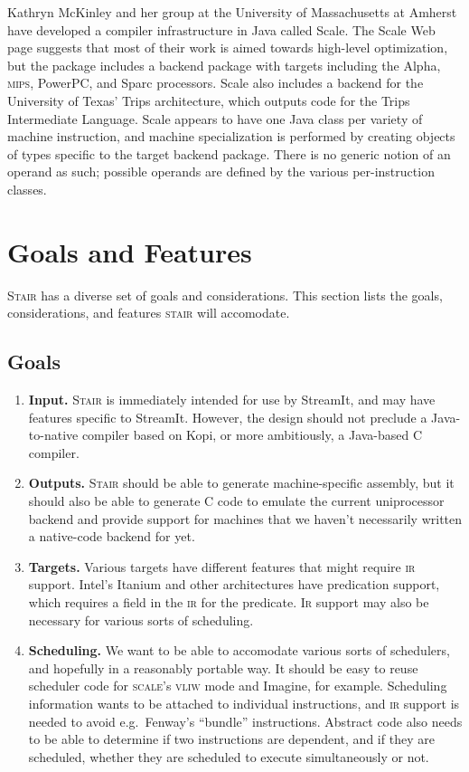 \documentclass[11pt]{article}
\def\ir{\textsc{ir}}
\def\Ir{\textsc{Ir}}
\def\mips{\textsc{mips}}
\def\scale{\textsc{scale}}
\def\stair{\textsc{stair}}
\def\Stair{\textsc{Stair}}
\def\vliw{\textsc{vliw}}
\begin{document}
Kathryn McKinley and her group at the University of Massachusetts at
Amherst have developed a compiler infrastructure in Java called
Scale\cite{scale-umass}.  The Scale Web page suggests that most of
their work is aimed towards high-level optimization, but the package
includes a backend package with targets including the Alpha, \mips,
PowerPC, and Sparc processors.  Scale also includes a backend for the
University of Texas' Trips architecture, which outputs code for the
Trips Intermediate Language.  Scale appears to have one Java class per
variety of machine instruction, and machine specialization is
performed by creating objects of types specific to the target backend
package.  There is no generic notion of an operand as such; possible
operands are defined by the various per-instruction classes.

\section{Goals and Features}

\Stair{} has a diverse set of goals and considerations.  This section
lists the goals, considerations, and features \stair{} will
accomodate.

\subsection{Goals}

\begin{enumerate}
\item \textbf{Input.}  \Stair{} is immediately intended for
  use by StreamIt, and may have features specific to StreamIt.
  However, the design should not preclude a Java-to-native compiler
  based on Kopi, or more ambitiously, a Java-based C compiler.
\item \textbf{Outputs.}  \Stair{} should be able to generate
  machine-specific assembly, but it should also be able to generate C
  code to emulate the current uniprocessor backend and provide support
  for machines that we haven't necessarily written a native-code
  backend for yet.
\item \textbf{Targets.}  Various targets have different features that
  might require \ir{} support.  Intel's Itanium and other architectures
  have predication support, which requires a field in the \ir{} for the
  predicate.  \Ir{} support may also be necessary for various sorts of
  scheduling.
\item \textbf{Scheduling.}  We want to be able to accomodate various
  sorts of schedulers, and hopefully in a reasonably portable way.  It
  should be easy to reuse scheduler code for \scale's \vliw{} mode and
  Imagine, for example.  Scheduling information wants to be attached
  to individual instructions, and \ir{} support is needed to avoid
  e.g.~Fenway's ``bundle'' instructions\cite{fenway}.  Abstract code
  also needs to be able to determine if two instructions are
  dependent, and if they are scheduled, whether they are scheduled to
  execute simultaneously or not.
\end{enumerate}
\end{document}
